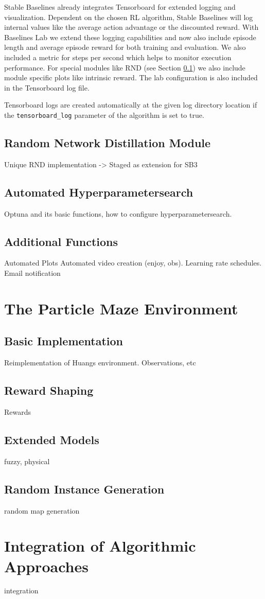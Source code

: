 Stable Baselines already integrates Tensorboard for extended logging and visualization. Dependent on the chosen RL algorithm, Stable Baselines will log internal values like the average action advantage or the discounted reward. With Baselines Lab we extend these logging capabilities and now also include episode length and average episode reward for both training and evaluation. We also included a metric for steps per second which helps to monitor execution performance. For special modules like RND (see Section \ref{sec:blRND}) we also include module specific plots like intrinsic reward. The lab configuration is also included in the Tensorboard log file.

Tensorboard logs are created automatically at the given log directory location if the \texttt{tensorboard\_log} parameter of the algorithm is set to true.


\subsection{Random Network Distillation Module} \label{sec:blRND}
Unique RND implementation -> Staged as extension for SB3

\subsection{Automated Hyperparametersearch} \label{sec:blSearch}
Optuna and its basic functions, how to configure hyperparametersearch.

\subsection{Additional Functions} \label{sec:blAdvanced}
Automated Plots
Automated video creation (enjoy, obs).
Learning rate schedules.
Email notification


\section{The Particle Maze Environment} \label{sec:MazeEnvironment}

\subsection{Basic Implementation} \label{sec:MazeImplementation}
Reimplementation of Huangs environment. Observations, etc

\subsection{Reward Shaping} \label{sec:MazeReward}
Rewards

\subsection{Extended Models} \label{sec:ExtendedMaze}
fuzzy, physical 

\subsection{Random Instance Generation} \label{sec:RandomInstanceGeneration}
random map generation

\section{Integration of Algorithmic Approaches} \label{sec:AlgorithmIntegration}
integration


